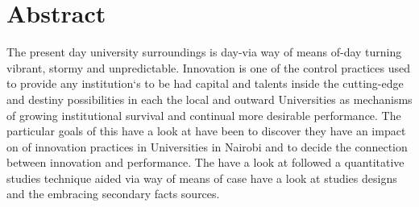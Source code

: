 \documentclass[twosided]{report}
\begin{document}


\chapter*{\textbf{Abstract}}
The present day university surroundings is day-via way of means of-day turning vibrant, stormy and unpredictable. Innovation is one of the control practices used to provide any institution`s to be had capital and talents inside the cutting-edge and destiny possibilities in each the local and outward Universities as mechanisms of growing institutional survival and continual more desirable performance. The particular goals of this have a look at have been to discover they have an impact on of innovation practices in Universities in Nairobi and to decide the connection between innovation and performance. The have a look at followed a quantitative studies technique aided via way of means of case have a look at studies designs and the embracing secondary facts sources.

\tableofcontents

\listoftables









\appendix

\end{document}

